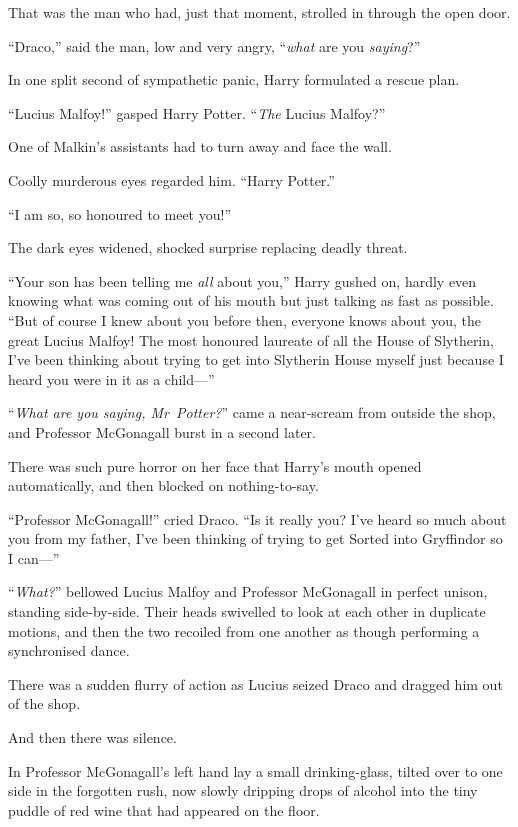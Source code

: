 That was the man who had, just that moment, strolled in through the open door.

“Draco,” said the man, low and very angry, “\emph{what} are you \emph{saying}?”

In one split second of sympathetic panic, Harry formulated a rescue plan.

“Lucius Malfoy!” gasped Harry Potter. “\emph{The} Lucius Malfoy?”

One of Malkin’s assistants had to turn away and face the wall.

Coolly murderous eyes regarded him. “Harry Potter.”

“I am so, so honoured to meet you!”

The dark eyes widened, shocked surprise replacing deadly threat.

“Your son has been telling me \emph{all} about you,” Harry gushed on, hardly even knowing what was coming out of his mouth but just talking as fast as possible. “But of course I knew about you before then, everyone knows about you, the great Lucius Malfoy! The most honoured laureate of all the House of Slytherin, I’ve been thinking about trying to get into Slytherin House myself just because I heard you were in it as a child—”

“\emph{What are you saying, Mr~Potter?}” came a near-scream from outside the shop, and Professor McGonagall burst in a second later.

There was such pure horror on her face that Harry’s mouth opened automatically, and then blocked on nothing-to-say.

“Professor McGonagall!” cried Draco. “Is it really you? I’ve heard so much about you from my father, I’ve been thinking of trying to get Sorted into Gryffindor so I can—”

“\emph{What?}” bellowed Lucius Malfoy and Professor McGonagall in perfect unison, standing side-by-side. Their heads swivelled to look at each other in duplicate motions, and then the two recoiled from one another as though performing a synchronised dance.

There was a sudden flurry of action as Lucius seized Draco and dragged him out of the shop.

And then there was silence.

In Professor McGonagall’s left hand lay a small drinking-glass, tilted over to one side in the forgotten rush, now slowly dripping drops of alcohol into the tiny puddle of red wine that had appeared on the floor.

